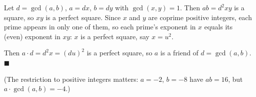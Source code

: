 Let $d=\gcd(a,b)$, $a=dx$, $b=dy$ with $\gcd(x,y)=1$. Then $ab=d^2xy$ is a square, so $xy$ is a perfect square. Since $x$ and $y$ are coprime positive integers, each prime appears in only one of them, so each prime's exponent in $x$ equals its (even) exponent in $xy$: $x$ is a perfect square, say $x=u^2$.

Then $a\cdot d=d^2x=(du)^2$ is a perfect square, so $a$ is a friend of $d=\gcd(a,b)$. $\blacksquare$

(The restriction to positive integers matters: $a=-2$, $b=-8$ have $ab=16$, but $a\cdot\gcd(a,b)=-4$.)
